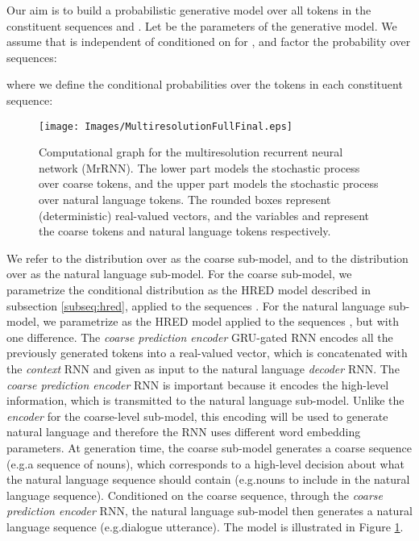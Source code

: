\documentclass{article}
\begin{document}
Our aim is to build a probabilistic generative model over all tokens in the constituent sequences  and .
Let  be the parameters of the generative model.
We assume that  is independent of  conditioned on  for , and factor the probability over sequences:

where we define the conditional probabilities over the tokens in each constituent sequence:


\begin{figure}[ht]
  \centering
  \texttt{[image: Images/MultiresolutionFullFinal.eps]}
  \caption{Computational graph for the multiresolution recurrent neural network (MrRNN). The lower part models the stochastic process over coarse tokens, and the upper part models the stochastic process over natural language tokens. The rounded boxes represent (deterministic) real-valued vectors, and the variables  and  represent the coarse tokens and natural language tokens respectively.}
  \label{fig:MultiresolutionHRED}
\end{figure}

We refer to the distribution over  as the coarse sub-model, and to the distribution over  as the natural language sub-model.
For the coarse sub-model, we parametrize the conditional distribution  as the HRED model described in subsection \ref{subseq:hred}, applied to the sequences .
For the natural language sub-model, we parametrize  as the HRED model applied to the sequences , but with one difference. The \textit{coarse prediction encoder} GRU-gated RNN encodes all the previously generated tokens  into a real-valued vector, which is concatenated with the \textit{context} RNN and given as input to the natural language \textit{decoder} RNN.
The \textit{coarse prediction encoder} RNN is important because it encodes the high-level information, which is transmitted to the natural language sub-model.
Unlike the \textit{encoder} for the coarse-level sub-model, 
this encoding will be used to generate natural language and therefore the RNN uses different word embedding parameters.
At generation time, the coarse sub-model generates a coarse sequence (e.g.\@ a sequence of nouns), which corresponds to a high-level decision about what the natural language sequence should contain (e.g.\@ nouns to include in the natural language sequence).
Conditioned on the coarse sequence, through the \textit{coarse prediction encoder} RNN, 
the natural language sub-model then generates a natural language sequence (e.g.\@ dialogue utterance).
The model is illustrated in Figure \ref{fig:MultiresolutionHRED}.
\end{document}
